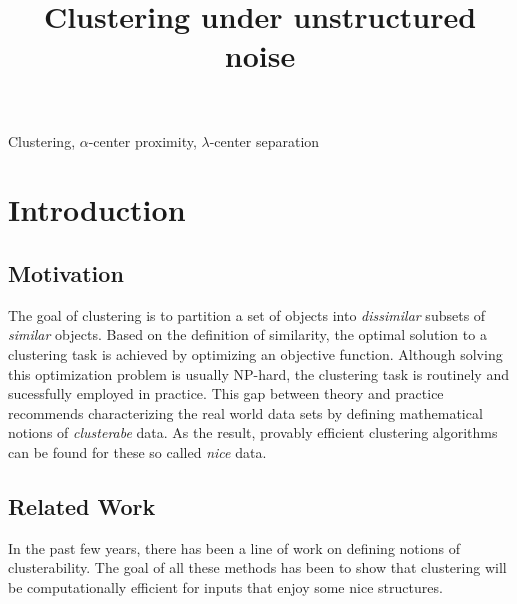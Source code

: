 \documentclass[anon,12pt]{colt2016} %
\title[Sparse Noise]{Clustering under unstructured noise}
\begin{document}
\maketitle

\begin{abstract}

\end{abstract}

\begin{keywords}
Clustering, $\alpha$-center proximity, $\lambda$-center separation
\end{keywords}

\section{Introduction}
\subsection{Motivation}

The goal of clustering is to partition a set of objects into {\em dissimilar} subsets of {\em similar} objects. Based on the definition of similarity, the optimal solution to a clustering task is achieved by optimizing an objective function. Although solving this optimization problem is usually NP-hard, the clustering task is routinely and sucessfully employed in practice. This gap between theory and practice recommends characterizing the real world data sets by defining mathematical notions of {\em clusterabe} data. As the result, provably efficient clustering algorithms can be found for these so called {\em nice} data.  


\subsection{Related Work}

In the past few years, there has been a line of work on defining notions of clusterability. The goal of all these methods has been to show that clustering will be computationally efficient for inputs that enjoy some nice structures. 




%
%
\end{document}
